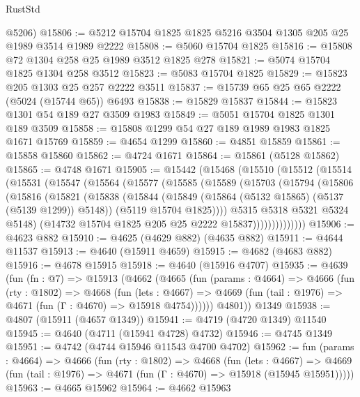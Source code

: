\begin{lexlean}{RustStd}
\begin{coremodule}
      @5206)
@15806 := @5212 @15704 @1825 @1825 @5216 @3504 @1305 @205 @25 @1989 @3514 @1989 @2222
@15808 := @5060 @15704 @1825
@15816 := @15808 @72 @1304 @258 @25 @1989 @3512 @1825 @278
@15821 := @5074 @15704 @1825 @1304 @258 @3512
@15823 := @5083 @15704 @1825
@15829 := @15823 @205 @1303 @25 @257 @2222 @3511
@15837 := @15739 @65 @25 @65 @2222 (@5024 (@15744 @65)) @6493
@15838 := @15829 @15837
@15844 := @15823 @1301 @54 @189 @27 @3509 @1983
@15849 := @5051 @15704 @1825 @1301 @189 @3509
@15858 := @15808 @1299 @54 @27 @189 @1989 @1983 @1825 @1671 @15769
@15859 := @4654 @1299
@15860 := @4851 @15859
@15861 := @15858 @15860
@15862 := @4724 @1671
@15864 := @15861 (@5128 @15862)
@15865 := @4748 @1671
@15905 := @15442
    (@15468
      (@15510
        (@15512
          (@15514
            (@15531
              (@15547
                (@15564
                  (@15577
                    (@15585
                      (@15589
                        (@15703
                          (@15794
                            (@15806
                              (@15816
                                (@15821
                                  (@15838
                                    (@15844
                                      (@15849 (@15864 (@5132 @15865) (@5137 (@5139 @1299)) @5148))
                                      (@5119 @15704 @1825))))
                                @5315
                                @5318
                                @5321
                                @5324
                                @5148)
                              (@14732 @15704 @1825 @205 @25 @2222 @15837))))))))))))))
@15906 := @4623 @882
@15910 := @4625 (@4629 @882) (@4635 @882)
@15911 := @4644 @11537
@15913 := @4640 (@15911 @4659)
@15915 := @4682 (@4683 @882)
@15916 := @4678 @15915
@15918 := @4640 (@15916 @4707)
@15935 := @4639
    (fun (fn : @7) =>
    @15913
      (@4662
        (@4665
          (fun (params : @4664) =>
          @4666
            (fun (rty : @1802) =>
            @4668
              (fun (lets : @4667) =>
              @4669 (fun (tail : @1976) => @4671 (fun (Γ : @4670) => @15918 @4754))))))
        @4801))
    @1349
@15938 := @4807 (@15911 (@4657 @1349))
@15941 := @4719 (@4720 @1349) @11540
@15945 := @4640 (@4711 (@15941 @4728) @4732)
@15946 := @4745 @1349
@15951 := @4742 (@4744 @15946 @11543 @4700 @4702)
@15962 := fun (params : @4664) =>
  @4666
    (fun (rty : @1802) =>
    @4668
      (fun (lets : @4667) =>
      @4669 (fun (tail : @1976) => @4671 (fun (Γ : @4670) => @15918 (@15945 @15951)))))
@15963 := @4665 @15962
@15964 := @4662 @15963

\end{coremodule}
\end{lexlean}

